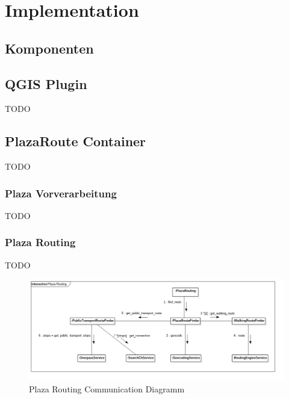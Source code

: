 
\section{Implementation}
\label{sec:Implementation}

\subsection{Komponenten}
\label{impl:Komponenten}

\subsection{QGIS Plugin}
\label{impl:QGIS Plugin}
TODO

\subsection{PlazaRoute Container}
\label{impl:PlazaRoute Container}
TODO

\subsubsection{Plaza Vorverarbeitung}
\label{impl:Plaza Vorverarbeitung}
TODO

\subsubsection{Plaza Routing}
\label{impl:Plaza Routing}
TODO

\begin{figure}[ht]
\centering
\includegraphics[width=1\linewidth]{projectdoc/img/communication_diagram}
\caption[Plaza Routing Collaboration Diagramm]{Plaza Routing Communication Diagramm}
\label{fig:communication_diagram}
\end{figure}


